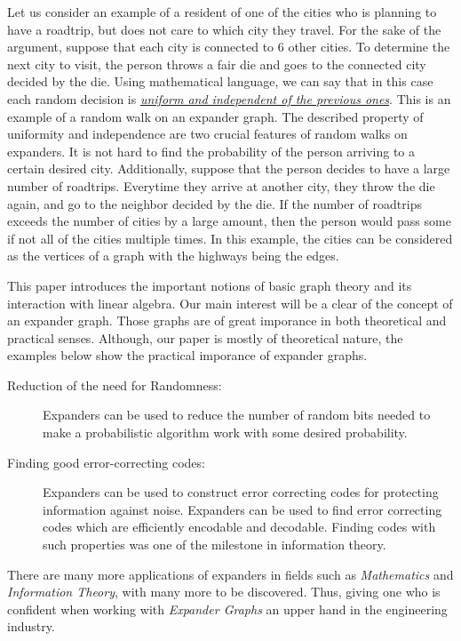 \documentclass{article}
\theoremstyle{theorem}
\theoremstyle{definition}
\theoremstyle{example}
\theoremstyle{proposition}
\begin{document}
    Let us consider an example of a resident of one of the cities who is planning to have a roadtrip, but does not care to which city they travel. For the sake of the argument, suppose that each city is connected to 6 other cities. To determine the next city to visit, the person throws a fair die and goes to the connected city decided by the die. Using mathematical language, we can say that in this case each random decision is \underline{\emph{uniform and independent of the previous ones}}. This is an example of a random walk on an expander graph. The described property of uniformity and independence are two crucial features of random walks on expanders.
    It is not hard to find the probability of the person arriving to a certain desired city. Additionally, suppose that the person decides to have a large number of roadtrips. Everytime they arrive at another city, they throw the die again, and go to the neighbor decided by the die. If the number of roadtrips exceeds the number of cities by a large amount, then the person would pass some if not all of the cities multiple times.
    In this example, the cities can be considered as the vertices of a graph with the highways being the edges.

    This paper introduces the important notions of basic graph theory and its interaction with linear algebra. Our main interest will be a clear of the concept of an expander graph. Those graphs are of great imporance in both theoretical and practical senses. Although, our paper is mostly of theoretical nature, the examples below show the practical imporance of expander graphs.
    
        \begin{description}
            \item[Reduction of the need for Randomness:] Expanders can be used to reduce the number of random bits needed to make a probabilistic algorithm work with some desired probability.
            \item[Finding good error-correcting codes:] Expanders can be used to construct error correcting codes for protecting information against noise. Expanders can be used to find error correcting codes which are efficiently encodable and decodable. Finding codes with such properties was one of the milestone in information theory.
        \end{description}

        There are many more applications of expanders in fields such as \textit{Mathematics} and \textit{Information Theory}, with many more to be discovered. Thus, giving one who is confident when working with \textit{Expander Graphs} an upper hand in the engineering industry.
\end{document}
